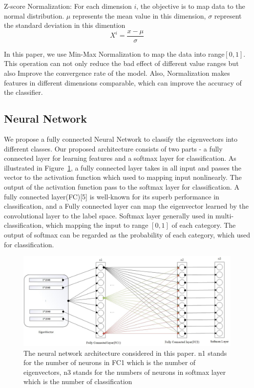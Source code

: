 \documentclass[runningheads]{llncs}
\begin{document}
Z-score Normalization: For each dimension $i$, the objective is to map data to the normal distribution. $\mu$ represents the mean value in this dimension, $\sigma$ represent the standard deviation in this dimention
\begin{equation}
	X^i=\frac{x-\mu}{\sigma}
\end{equation}

In this paper, we use Min-Max Normalization to map the data into range$[0,1]$. This operation can not only reduce the bad effect of different value ranges but also Improve the convergence rate of the model. Also, Normalization makes features in different dimensions comparable, which can improve the accuracy of the classifier.

\subsection{Neural Network}
We propose a fully connected Neural Network to classify the eigenvectors into different classes. Our proposed architecture consists of two parts - a fully connected layer for learning features and a softmax layer for classification. As illustrated in Figure~\ref{fig2}, a fully connected layer takes in all input and passes the vector to the activation function which used to mapping input nonlinearly. The output of the activation function pass to the softmax layer for classification. A fully connected layer(FC)[5] is well-known for its superb performance in classification, and a Fully connected layer can map the eigenvector learned by the convolutional layer to the label space. Softmax layer generally used in multi-classification, which mapping the input to range $[0,1]$ of each category. The output of softmax can be regarded as the probability of each category, which used for classification.

\begin{figure}
	\includegraphics[width=\textwidth]{fig2.jpg}
	\caption{The neural network architecture considered in this paper. n1 stands for the number of neurons in FC1 which is the number of eigenvectors, n3 stands for the numbers of neurons in softmax layer which is the number of classification} \label{fig2}
\end{figure}
\end{document}
